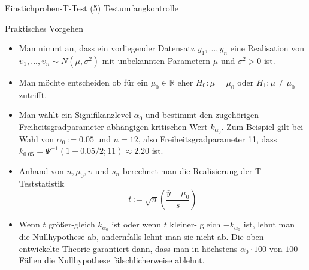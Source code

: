 \documentclass[
  8pt,
  ignorenonframetext,
]{beamer}
\newcommand{\ups} {\upsilon}
\begin{document}
\begin{frame}{Einstichproben-T-Test \textbar{} (5) Testumfangkontrolle}
\protect\hypertarget{einstichproben-t-test-5-testumfangkontrolle-3}{}
\justifying

\noindent \vspace{1mm} Praktisches Vorgehen \small

\begin{itemize}
\item
  \justifying Man nimmt an, dass ein vorliegender Datensatz
  \(y_1,...,y_n\) eine Realisation von
  \(\ups_1,...,\ups_n \sim N(\mu,\sigma^2)\) mit unbekannten Parametern
  \(\mu\) und \(\sigma^2 > 0\) ist.
\item
  Man möchte entscheiden ob für ein \(\mu_0 \in \mathbb{R}\) eher
  \(H_0 : \mu = \mu_0\) oder \(H_1: \mu \neq \mu_0\) zutrifft.

  \item

  Man wählt ein Signifikanzlevel \(\alpha_0\) und bestimmt den
  zugehörigen Freiheitsgradparameter-abhängigen kritischen Wert
  \(k_{\alpha_0}\). Zum Beispiel gilt bei Wahl von \(\alpha_0 := 0.05\)
  und \(n=12\), also Freiheitsgradparameter 11, dass
  \(k_{0.05}=\Psi^{-1}(1 - 0.05/2; 11) \approx 2.20\) ist.
\item
  Anhand von \(n, \mu_0, \bar{\ups}\) und \(s_n\) berechnet man die
  Realisierung der T-Teststatistik \begin{equation}
  t := \sqrt{n}\left(\frac{\bar{y} - \mu_0}{s}\right)
  \end{equation}
\item
  Wenn \(t\) größer-gleich \(k_{\alpha_0}\) ist oder wenn \(t\) kleiner-
  gleich \(-k_{\alpha_0}\) ist, lehnt man die Nullhypothese ab,
  andernfalls lehnt man sie nicht ab. Die oben entwickelte Theorie
  garantiert dann, dass man in höchstens \(\alpha_0 \cdot 100\) von
  \(100\) Fällen die Nullhypothese fälschlicherweise ablehnt.
\end{itemize}
\end{frame}
\end{document}
